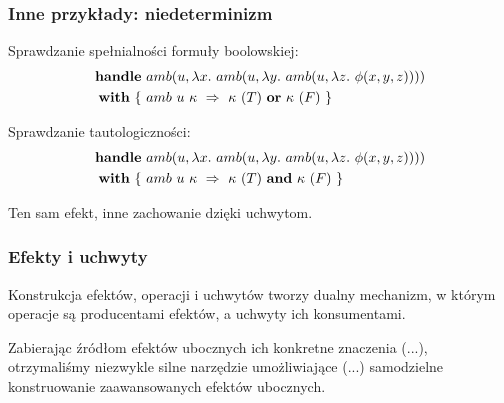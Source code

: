\begin{frame}
  \frametitle{Inne przykłady: niedeterminizm}

  Sprawdzanie spełnialności formuły boolowskiej:
  \begin{equation*}\begin{split}
  \handle{
    &\op{amb}{u}{\fun{x}{
        \op{amb}{u}{\fun{y}{
            \op{amb}{u}{\fun{z}{
                \phi(x, y, z)
            }}
        }}
    }}\\
  }{ \{ \ &\hcase{amb}{u\ \kappa}{ \kappa\ (T) \ \mathbf{or} \ \kappa\ (F) } \ \} }
  \end{split}\end{equation*}

  Sprawdzanie tautologiczności:
  \begin{equation*}\begin{split}
  \handle{
    &\op{amb}{u}{\fun{x}{
        \op{amb}{u}{\fun{y}{
            \op{amb}{u}{\fun{z}{
                \phi(x, y, z)
            }}
        }}
    }}\\
  }{ \{ \ &\hcase{amb}{u\ \kappa}{ \kappa\ (T) \ \mathbf{and} \ \kappa\ (F) } \ \} }
  \end{split}\end{equation*}

  Ten sam efekt, inne zachowanie dzięki uchwytom.
\end{frame}

\begin{frame}
  \frametitle{Efekty i uchwyty}
  Konstrukcja efektów, operacji i uchwytów tworzy dualny mechanizm, w którym operacje są producentami efektów, a uchwyty ich konsumentami.

  \vspace{1em}

  Zabierając źródłom efektów ubocznych ich konkretne znaczenia (...), otrzymaliśmy niezwykle silne narzędzie umożliwiające (...) samodzielne konstruowanie zaawansowanych efektów ubocznych.
\end{frame}
